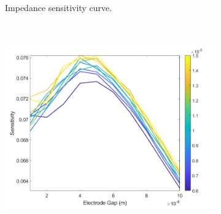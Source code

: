 \begin{figure}[h]
\begin{subfigure}[t]{0.49\textwidth}
        \caption{Impedance sensitivity curve.}
    \end{subfigure}
    \\
    \vspace{0.1 in}
    \begin{subfigure}[t]{0.49\textwidth}
        \centering
        \includegraphics[width=\textwidth]{images/comsol_simple_gapXsensitivity.png}
        
        
        

\end{subfigure}
\end{figure}
